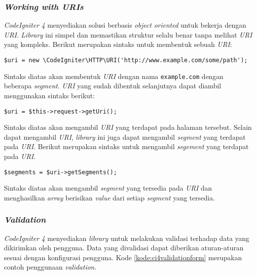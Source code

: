 \subsubsection{\textit{Working with URIs}}
\textit{CodeIgniter 4} menyediakan solusi berbasis \textit{object oriented} untuk bekerja dengan \textit{URI}. \textit{Library} ini simpel dan memastikan struktur selalu benar tanpa melihat \textit{URI} yang kompleks. Berikut merupakan sintaks untuk membentuk sebuah \textit{URI}:
\begin{center}
	\verb|$uri = new \CodeIgniter\HTTP\URI('http://www.example.com/some/path');|
\end{center}
Sintaks diatas akan membentuk \textit{URI} dengan nama \texttt{example.com} dengan beberapa \textit{segment}. \textit{URI} yang sudah dibentuk selanjutnya dapat diambil menggunakan sintaks berikut:
\begin{center}
	\verb|$uri = $this->request->getUri();|
\end{center}
Sintaks diatas akan mengambil \textit{URI} yang terdapat pada halaman tersebut. Selain dapat mengambil \textit{URI}, \textit{library} ini juga dapat mengambil \textit{segment} yang terdapat pada \textit{URI}. Berikut merupakan sintaks untuk mengambil \textit{segement} yang terdapat pada \textit{URI}.
\begin{center}
	\verb|$segments = $uri->getSegments();|
\end{center}
Sintaks diatas akan mengambil \textit{segment} yang tersedia pada \textit{URI} dan menghasilkan \textit{array} berisikan \textit{value} dari setiap \textit{segment} yang tersedia.

\subsubsection{\textit{Validation}}
\textit{CodeIgniter 4} menyediakan \textit{library} untuk melakukan validasi terhadap data yang dikirimkan oleh pengguna. Data yang divalidasi dapat diberikan aturan-aturan sesuai dengan konfigurasi pengguna. Kode \ref{kode:ci4validationform} merupakan contoh penggunaan \textit{validation}.

